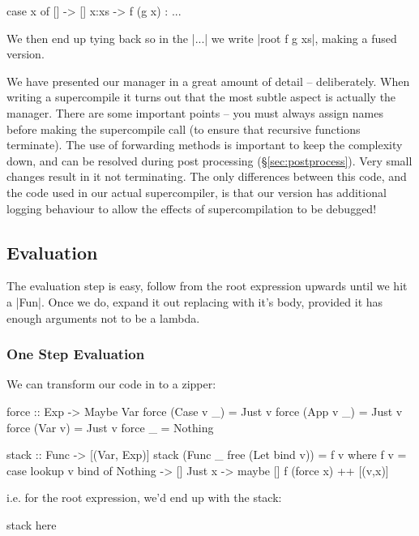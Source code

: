 \documentclass{sigplanconf}
\begin{document}
\begin{code}
case x of
   [] -> []
   x:xs -> f (g x) : ...
\end{code}

We then end up tying back so in the |...| we write |root f g xs|, making a fused version.

We have presented our manager in a great amount of detail -- deliberately. When writing a supercompile it turns out that the most subtle aspect is actually the manager. There are some important points -- you must always assign names before making the supercompile call (to ensure that recursive functions terminate). The use of forwarding methods is important to keep the complexity down, and can be resolved during post processing (\S\ref{sec:postprocess}). Very small changes result in it not terminating. The only differences between this code, and the code used in our actual supercompiler, is that our version has additional logging behaviour to allow the effects of supercompilation to be debugged!

\subsection{Evaluation}
\label{sec:eval}

The evaluation step is easy, follow from the root expression upwards until we hit a |Fun|. Once we do, expand it out replacing with it's body, provided it has enough arguments not to be a lambda.

\subsubsection{One Step Evaluation}

We can transform our code in to a zipper:

\begin{code}
force :: Exp -> Maybe Var
force (Case v _) = Just v
force (App v _) = Just v
force (Var v) = Just v
force _ = Nothing

stack :: Func -> [(Var, Exp)]
stack (Func _ free (Let bind v)) = f v
    where f v = case lookup v bind of
                     Nothing -> []
                     Just x -> maybe [] f (force x) ++ [(v,x)]
\end{code}

i.e. for the root expression, we'd end up with the stack:

\begin{code}
stack here
\end{code}
\end{document}
